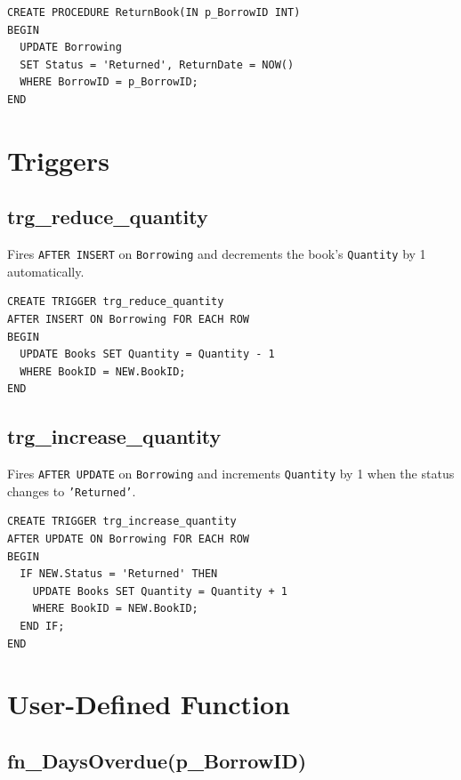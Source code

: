 \documentclass[12pt,a4paper,oneside]{report}
\begin{document}
\begin{lstlisting}[style=sqlstyle, caption={Stored Procedure: ReturnBook}]
CREATE PROCEDURE ReturnBook(IN p_BorrowID INT)
BEGIN
  UPDATE Borrowing
  SET Status = 'Returned', ReturnDate = NOW()
  WHERE BorrowID = p_BorrowID;
END
\end{lstlisting}

\section{Triggers}

\subsection{trg\_reduce\_quantity}

Fires \texttt{AFTER INSERT} on \texttt{Borrowing} and decrements the book's
\texttt{Quantity} by 1 automatically.

\begin{lstlisting}[style=sqlstyle, caption={Trigger: trg\_reduce\_quantity}]
CREATE TRIGGER trg_reduce_quantity
AFTER INSERT ON Borrowing FOR EACH ROW
BEGIN
  UPDATE Books SET Quantity = Quantity - 1
  WHERE BookID = NEW.BookID;
END
\end{lstlisting}

\subsection{trg\_increase\_quantity}

Fires \texttt{AFTER UPDATE} on \texttt{Borrowing} and increments \texttt{Quantity}
by 1 when the status changes to \texttt{'Returned'}.

\begin{lstlisting}[style=sqlstyle, caption={Trigger: trg\_increase\_quantity}]
CREATE TRIGGER trg_increase_quantity
AFTER UPDATE ON Borrowing FOR EACH ROW
BEGIN
  IF NEW.Status = 'Returned' THEN
    UPDATE Books SET Quantity = Quantity + 1
    WHERE BookID = NEW.BookID;
  END IF;
END
\end{lstlisting}

\section{User-Defined Function}

\subsection{fn\_DaysOverdue(p\_BorrowID)}
\end{document}
